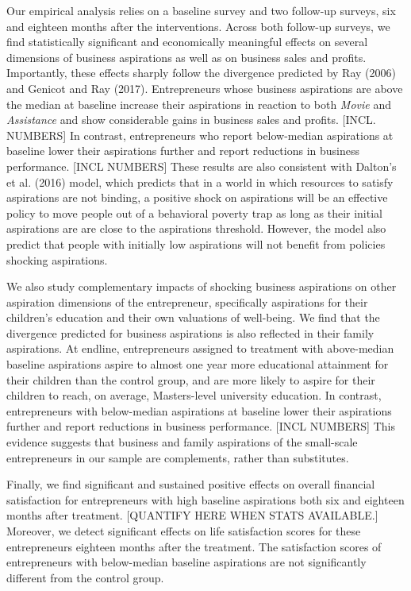 \documentclass[11.5pt]{article}
\begin{document}
Our empirical analysis relies on a baseline survey and two follow-up surveys, six and eighteen months after the interventions. Across both follow-up surveys, we find statistically significant and economically meaningful effects on several dimensions of business aspirations as well as on business sales and profits. Importantly, these effects sharply follow the divergence predicted by Ray (2006) and Genicot and Ray (2017). Entrepreneurs whose business aspirations are above the median at baseline increase their aspirations in reaction to both \emph{Movie} and \emph{Assistance} and show considerable gains in business sales and profits. [INCL. NUMBERS] In contrast, entrepreneurs who report below-median aspirations at baseline lower their aspirations further and report reductions in business performance. [INCL NUMBERS] These results are also consistent with Dalton's et al. (2016) model, which predicts that in a world in which resources to satisfy aspirations are not binding, a positive shock on aspirations will be an effective policy to move people out of a behavioral poverty trap as long as their initial aspirations are are close to the aspirations threshold. However, the model also predict that people with initially low aspirations will not benefit from policies shocking aspirations.

We also study complementary impacts of shocking business aspirations on other aspiration dimensions of the entrepreneur, specifically aspirations for their children's education and their own valuations of well-being. We find that the divergence predicted for business aspirations is also reflected in their family aspirations. At endline, entrepreneurs assigned to treatment with above-median baseline aspirations aspire to almost one year more educational attainment for their children than the control group, and are more likely to aspire for their children to reach, on average, Masters-level university education. In contrast, entrepreneurs with below-median aspirations at baseline lower their aspirations further and report reductions in business performance. [INCL NUMBERS] This evidence suggests that business and family aspirations of the small-scale entrepreneurs in our sample are complements, rather than substitutes.

Finally, we find significant and sustained positive effects on overall financial satisfaction for entrepreneurs with high baseline aspirations both six and eighteen months after treatment. [QUANTIFY HERE WHEN STATS AVAILABLE.] Moreover, we detect significant effects on life satisfaction scores for these entrepreneurs eighteen months after the treatment. The satisfaction scores of entrepreneurs with below-median baseline aspirations are not significantly different from the control group.
\end{document}
